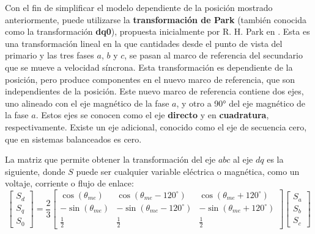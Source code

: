 Con el fin de simplificar el modelo dependiente de la posición mostrado anteriormente, puede utilizarse la \textbf{transformación de Park} (también conocida como la transformación \textbf{dq0}), propuesta inicialmente por R. H. Park en \cite{park1929}. Esta es una transformación lineal en la que cantidades desde el punto de vista del primario y las tres fases $a$, $b$ y $c$, se pasan al marco de referencia del secundario que se mueve a velocidad síncrona. Esta transformación es dependiente de la posición, pero produce componentes en el nuevo marco de referencia, que son independientes de la posición. Este nuevo marco de referencia contiene dos ejes, uno alineado con el eje magnético de la fase $a$, y otro a 90° del eje magnético de la fase $a$. Estos ejes se conocen como el eje \textbf{directo} y en \textbf{cuadratura}, respectivamente. Existe un eje adicional, conocido como el eje de secuencia cero, que en sistemas balanceados es cero.

La matriz que permite obtener la transformación del eje $abc$ al eje $dq$ es la siguiente, donde $S$ puede ser cualquier variable eléctrica o magnética, como un voltaje, corriente o flujo de enlace:
\begin{equation}
\begin{bmatrix}
S_d\\ 
S_q\\ 
S_0
\end{bmatrix}
=\frac{2}{3}
\begin{bmatrix}
\cos(\theta_{me}) & \cos(\theta_{me}-120^\circ) & \cos(\theta_{me}+120^\circ)\\
-\sin(\theta_{me}) & -\sin(\theta_{me}-120^\circ) & -\sin(\theta_{me}+120^\circ)\\
\frac{1}{2} & \frac{1}{2} & \frac{1}{2}
\end{bmatrix}
\begin{bmatrix}
S_a\\ 
S_b\\ 
S_c
\end{bmatrix}
\end{equation}

